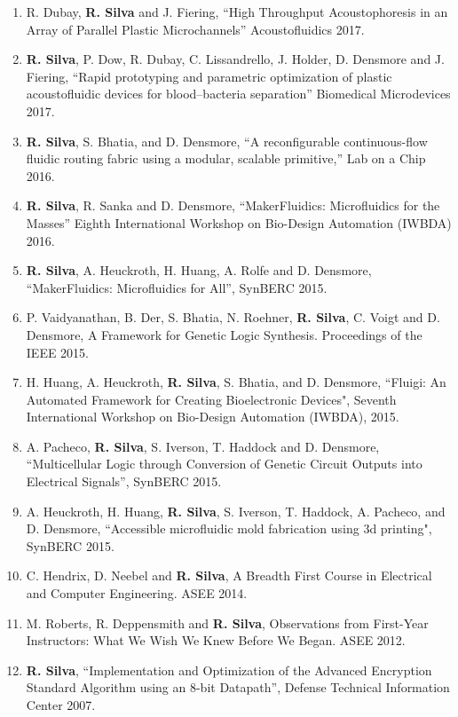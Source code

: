 \small
\begin{enumerate}
	\item{R. Dubay, \textbf{R. Silva} and J. Fiering, ``High Throughput Acoustophoresis in an Array of Parallel Plastic Microchannels'' Acoustofluidics 2017.}
	\item{\textbf{R. Silva}, P. Dow, R. Dubay, C. Lissandrello, J. Holder, D. Densmore and J. Fiering, ``Rapid prototyping and parametric optimization of plastic acoustofluidic devices for blood--bacteria separation'' Biomedical Microdevices 2017.}
	\item{\textbf{R. Silva}, S. Bhatia, and D. Densmore, ``A reconfigurable continuous-flow fluidic routing fabric using a modular, scalable primitive,'' Lab on a Chip 2016.}
	\item{\textbf{R. Silva}, R. Sanka and D. Densmore, ``MakerFluidics: Microfluidics for the Masses'' Eighth International Workshop on Bio-Design Automation (IWBDA) 2016.}
	\item{\textbf{R. Silva}, A. Heuckroth, H. Huang, A. Rolfe and D. Densmore, ``MakerFluidics: Microfluidics for All'', SynBERC 2015.}
	\item{P. Vaidyanathan, B. Der, S. Bhatia, N. Roehner, \textbf{R. Silva}, C. Voigt and D. Densmore, A Framework for Genetic Logic Synthesis. Proceedings of the IEEE 2015.}
	\item{H. Huang, A. Heuckroth, \textbf{R. Silva}, S. Bhatia, and D. Densmore, ``Fluigi: An Automated Framework for Creating Bioelectronic Devices", Seventh International Workshop on Bio-Design Automation (IWBDA), 2015.}
	\item{A. Pacheco, \textbf{R. Silva}, S. Iverson, T. Haddock and D. Densmore, ``Multicellular Logic through Conversion of Genetic Circuit Outputs into Electrical Signals'', SynBERC 2015.}
	\item{A. Heuckroth, H. Huang, \textbf{R. Silva}, S. Iverson, T. Haddock, A. Pacheco, and D. Densmore, ``Accessible microfluidic mold fabrication using 3d printing", SynBERC 2015.}
	\item{C. Hendrix, D. Neebel and \textbf{R. Silva}, A Breadth First Course in Electrical and Computer Engineering. ASEE 2014.}
	\item{M. Roberts, R. Deppensmith and \textbf{R. Silva}, Observations from First-Year Instructors: What We Wish We Knew Before We Began. ASEE 2012.}
	\item{\textbf{R. Silva}, ``Implementation and Optimization of the Advanced Encryption Standard Algorithm using an 8-bit Datapath'', Defense Technical Information Center 2007.}
\end{enumerate}

